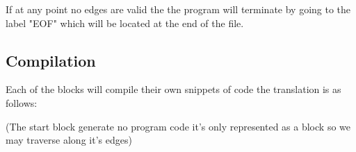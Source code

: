 If at any point no edges are valid the the program will terminate by going to the label "EOF" which will be located at the end of the file.

\subsection{Compilation}
Each of the blocks will compile their own snippets of code the translation is as follows:

\begin{definition}
\label{def:startblock}
(The start block generate no program code it's only represented as a block so we may traverse along it's edges)
\end{definition}

